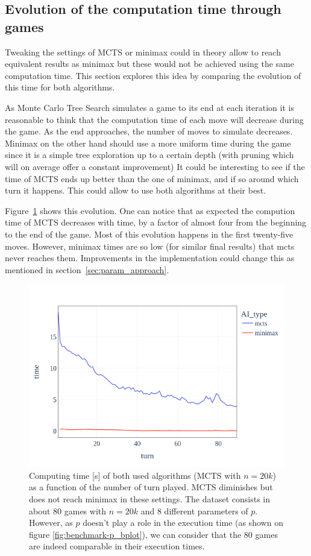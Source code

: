 \subsection{Evolution of the computation time through games}
Tweaking the settings of MCTS or minimax could in theory allow to reach equivalent results as minimax but these would not be achieved using the same computation time.
This section explores this idea by comparing the evolution of this time for both algorithms.

As Monte Carlo Tree Search simulates a game to its end at each iteration it is reasonable to think that the computation
time of each move will decrease during the game.
As the end approaches, the number of moves to simulate decreases.
Minimax on the other hand should use a more uniform time during the game since it is a simple tree exploration up to a certain depth (with pruning which will on average offer a constant improvement)
It could be interesting to see if the time of MCTS ends up better than the one of minimax, and if so around which turn it happens.
This could allow to use both algorithms at their best.

Figure~\ref{fig:benchmark-time_turn} shows this evolution.
One can notice that as expected the compution time of MCTS decreases with time, by a factor of almost four from the beginning to the end of the game.
Most of this evolution happens in the first twenty-five moves. 
However, minimax times are so low (for similar final results) that mcts never reaches them. 
Improvements in the implementation could change this as mentioned in section~\ref{sec:param_approach}.

\begin{figure}[ht]
    \centering
    \includegraphics[width=\linewidth]{plots/AvgTime_n20000.png}
    \caption{Computing time [s] of both used algorithms (MCTS with $n=20k$) as a function of the number of turn played. MCTS diminishes but does not reach minimax in these settings. The dataset consists in about 80 games with $n=20k$ and 8 different parameters of $p$. However, as $p$ doesn't play a role in the execution time (as shown on figure \ref{fig:benchmark-p_bplot}), we can consider that the 80 games are indeed comparable in their execution times.}
    \label{fig:benchmark-time_turn}
\end{figure}